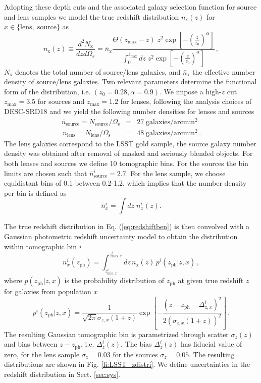 \documentclass[fleqn,usenatbib,useAMS]{mnras}
\newcommand{\bea}{\begin{eqnarray}}
\newcommand{\be}{\begin{equation}}
\newcommand{\eea}{\end{eqnarray}}
\newcommand{\ee}{\end{equation}}
\begin{document}
Adopting these depth cuts and the associated galaxy selection function for source and lens samples we model the true redshift distribution $n_{\mathrm{x}}(z)$ for $x\in\{\mathrm{lens},\; \mathrm{source}\}$ as 
\be 
\label{eq:redshiftben}
n_{\mathrm{x}}(z) \equiv \frac{d^2 N_{\mathrm{x}}}{dzd\Omega_s} = \bar{n}_{\mathrm{x}}\frac{ \Theta(z_{\mathrm{max}}-z)\; z^{2} \exp \left[ - \left(  \frac{z}{z_0} \right)^{\alpha} \right]}{\int_0^{z_{\mathrm{max}}} dz\;z^{2} \exp \left[ - \left(  \frac{z}{z_0} \right)^{\alpha} \right]} \,,
\ee 
$N_{\mathrm{x}}$ denotes the total number of source/lens galaxies, and $\bar{n}_{\mathrm{x}}$ the effective number density of source/lens galaxies. Two relevant parameters determine the functional form of the distribution, i.e. $(z_0=0.28, \alpha=0.9)$. We impose a high-$z$ cut $z_{\mathrm{max}}=3.5$ for sources and $z_{\mathrm{max}}=1.2$ for lenses, following the analysis choices of DESC-SRD18 and we yield the following number densities for lenses and sources  
\bea
\label{eq:nbar}
\bar{n}_{\mathrm{source}} = N_{\mathrm{source}}/\Omega_{\mathrm{s}} &=& 27\;\mathrm{galaxies/arcmin^2} \\ \,
\bar{n}_{\mathrm{lens}} = N_{\mathrm{lens}}/\Omega_{\mathrm{s}} &=& 48\;\mathrm{galaxies/arcmin^2}\,.
\eea
The lens galaxies correspond to the LSST gold sample, the source galaxy number density was obtained after removal of masked and seriously blended objects. For both lenses and sources we define 10 tomographic bins. For the sources the bin limits are chosen such that $\bar{n}^i_{\mathrm{source}}=2.7$. For the lens sample, we choose equidistant bins of 0.1 between 0.2-1.2, which implies that the number density per bin is defined as 
\be
\label{eq:nbar}
\bar{n}_x^i = \int dz\; n_x^i(z).
\ee

The true redshift distribution in Eq. (\ref{eq:redshiftben}) is then convolved with a Gaussian photometric redshift uncertainty model to obtain the distribution within tomographic bin $i$
\be
\label{eq:photoz}
n^i_x(z_{\mathrm{ph}}) = \int_{z^i_{\mathrm{min},x}}^{z^i_{\mathrm{max},x}} dz \, n_{\mathrm{x}}(z) \, p^i\left(z_{\mathrm{ph}}|z,x\right)\,,
\ee
where $p\left(z_{\mathrm{ph}}|z,x\right)$ is the probability distribution of $z_{\mathrm{ph}}$ at given true redshift $z$ for galaxies from population $x$ 
\be
\label{eq:redbin}
p^i\left(z_{\mathrm{ph}}|z,x\right) = \frac{1}{\sqrt{2\pi}\sigma_{z,x}(1+z)}
\exp\left[-\frac{\left(z-z_{\mathrm{ph}} - \Delta^i_{z,x}\right)^2}{2\left(\sigma_{z,x}(1+z)\right)^2}\right]\,.
\ee
The resulting Gaussian tomographic bin is parametrized through scatter $\sigma_z(z)$ and bias between $z-z_{\mathrm{ph}}$, i.e. $\Delta^i_z(z)$. The bias $\Delta^i_z(z)$ has fiducial value of zero, for the lens sample $\sigma_z=0.03$ for the sources $\sigma_z=0.05$. The resulting distributions are shown in Fig. \ref{fi:LSST_zdistri}. We define uncertainties in the redshift distribution in Sect. \ref{sec:sys}.
\end{document}
